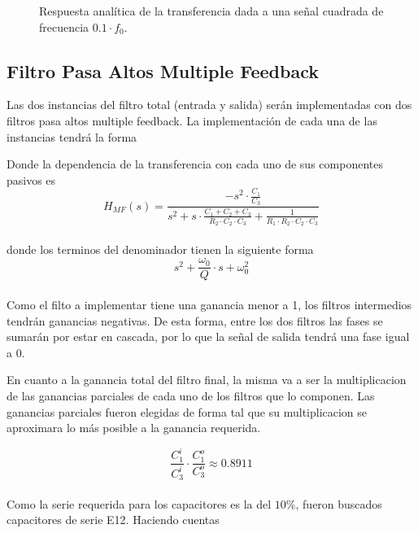 \documentclass[10pt,a4paper]{article}
\begin{document}
    \begin{figure}[H]
        \centering
        \scalebox{0.9}{}
        \caption{Respuesta analítica de la transferencia dada a una señal cuadrada de frecuencia $0.1 \cdot f_0$.}
        \label{fig}
    \end{figure}


    \subsection{Filtro Pasa Altos Multiple Feedback}\label{subsec:filtro-pasa-altos-multiple-feedback}

    Las dos instancias del filtro total (entrada y salida) serán implementadas con dos filtros pasa altos multiple feedback.
    La implementación de cada una de las instancias tendrá la forma


    Donde la dependencia de la transferencia con cada uno de sus componentes pasivos es \\

    \[ H_{MF}(s) = \frac{-s^{2}\cdot \frac{C_{1}}{C_{3}}}{s^{2}+s \cdot \frac{C_{1}+C_{2}+C_{3}}{R_{2}\cdot C_{2} \cdot C_{3}} + \frac{1}{R_{1} \cdot R_{2} \cdot C_{2} \cdot C_{3}}} \] \\

    donde los terminos del denominador tienen la siguiente forma \\

    \[s^{2}+ \frac{\omega_{0}}{Q} \cdot s + \omega_{0}^{2} \] \\

    Como el filto a implementar tiene una ganancia menor a 1, los filtros intermedios tendrán ganancias negativas.
    De esta forma, entre los dos filtros las fases se sumarán por estar en cascada, por lo que la señal de salida tendrá una fase igual a $0$.

    En cuanto a la ganancia total del filtro final, la misma va a ser la multiplicacion de las ganancias parciales de cada uno de los filtros que lo componen.
    Las ganancias parciales fueron elegidas de forma tal que su multiplicacion se aproximara lo más posible a la ganancia requerida.

    \[ \frac{C_{1}^{i}}{C_{3}^{i}} \cdot \frac{C_{1}^{o}}{C_{3}^{o}} \approx  0.8911 \] \\

    Como la serie requerida para los capacitores es la del $10\%$, fueron buscados capacitores de serie E12.
    Haciendo cuentas \\
\end{document}
